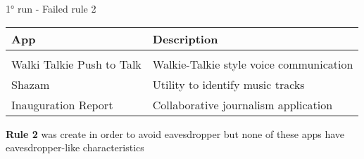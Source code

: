 \begin{frame}{\ang{1} run - Failed rule 2}

\fontsize{10pt}{0}\selectfont
\begin{table}[]
\centering
\begin{tabular}{ll}
\textbf{App}              & \textbf{Description}                    \\[5pt] 
\hline\\[5pt]
Walki Talkie Push to Talk & Walkie-Talkie style voice communication \\[5pt]
Shazam                    & Utility to identify music tracks        \\[5pt]
Inauguration Report       & Collaborative journalism application    \\[5pt]
\hline
\end{tabular}
\end{table}
\fontsize{15pt}{0}\selectfont

\vfill

\textbf{Rule 2} was create in order to avoid eavesdropper but none of these apps
have eavesdropper-like characteristics

\end{frame}